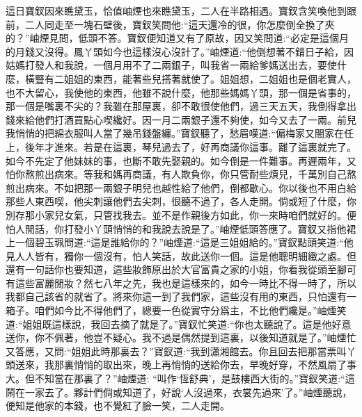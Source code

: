 \begin{parag}
    這日寶釵因來瞧黛玉，恰值岫煙也來瞧黛玉，二人在半路相遇。寶釵含笑喚他到跟前，二人同走至一塊石壁後，寶釵笑問他:“這天還冷的很，你怎麼倒全換了夾的？”岫煙見問，低頭不答。寶釵便知道又有了原故，因又笑問道:“必定是這個月的月錢又沒得。鳳丫頭如今也這樣沒心沒計了。”岫煙道:“他倒想著不錯日子給，因姑媽打發人和我說，一個月用不了二兩銀子，叫我省一兩給爹媽送出去，要使什麼，橫豎有二姐姐的東西，能著些兒搭著就使了。姐姐想，二姐姐也是個老實人，也不大留心，我使他的東西，他雖不說什麼，他那些媽媽丫頭，那一個是省事的，那一個是嘴裏不尖的？我雖在那屋裏，卻不敢很使他們，過三天五天，我倒得拿出錢來給他們打酒買點心喫纔好。因一月二兩銀子還不夠使，如今又去了一兩。前兒我悄悄的把綿衣服叫人當了幾吊錢盤纏。”寶釵聽了，愁眉嘆道:“偏梅家又閤家在任上，後年才進來。若是在這裏，琴兒過去了，好再商議你這事。離了這裏就完了。如今不先定了他妹妹的事，也斷不敢先娶親的。如今倒是一件難事。再遲兩年，又怕你熬煎出病來。等我和媽再商議，有人欺負你，你只管耐些煩兒，千萬別自己熬煎出病來。不如把那一兩銀子明兒也越性給了他們，倒都歇心。你以後也不用白給那些人東西喫，他尖刺讓他們去尖刺，很聽不過了，各人走開。倘或短了什麼，你別存那小家兒女氣，只管找我去。並不是作親後方如此，你一來時咱們就好的。便怕人閒話，你打發小丫頭悄悄的和我說去說是了。”岫煙低頭答應了。寶釵又指他裙上一個碧玉珮問道:“這是誰給你的？”岫煙道:“這是三姐姐給的。”寶釵點頭笑道:“他見人人皆有，獨你一個沒有，怕人笑話，故此送你一個。這是他聰明細緻之處。但還有一句話你也要知道，這些妝飾原出於大官富貴之家的小姐，你看我從頭至腳可有這些富麗閒妝？然七八年之先，我也是這樣來的，如今一時比不得一時了，所以我都自己該省的就省了。將來你這一到了我們家，這些沒有用的東西，只怕還有一箱子。咱們如今比不得他們了，總要一色從實守分爲主，不比他們纔是。”岫煙笑道:“姐姐既這樣說，我回去摘了就是了。”寶釵忙笑道:“你也太聽說了。這是他好意送你，你不佩著，他豈不疑心。我不過是偶然提到這裏，以後知道就是了。”岫煙忙又答應，又問:“姐姐此時那裏去？”寶釵道:“我到瀟湘館去。你且回去把那當票叫丫頭送來，我那裏悄悄的取出來，晚上再悄悄的送給你去，早晚好穿，不然風扇了事大。但不知當在那裏了？”岫煙道: “叫作‘恆舒典’，是鼓樓西大街的。”寶釵笑道:“這鬧在一家去了。夥計們倘或知道了，好說‘人沒過來，衣裳先過來’了。”岫煙聽說，便知是他家的本錢，也不覺紅了臉一笑，二人走開。
\end{parag}


